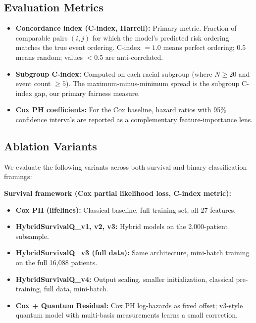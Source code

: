 \documentclass[12pt, letterpaper]{article}
\begin{document}
\subsection{Evaluation Metrics}
\begin{itemize}
    \item \textbf{Concordance index (C-index, Harrell):} Primary metric. Fraction of comparable pairs $(i, j)$ for which the model's predicted risk ordering matches the true event ordering. C-index $= 1.0$ means perfect ordering; $0.5$ means random; values $< 0.5$ are anti-correlated.
    \item \textbf{Subgroup C-index:} Computed on each racial subgroup (where $N \geq 20$ and event count $\geq 5$). The maximum-minus-minimum spread is the subgroup C-index gap, our primary fairness measure.
    \item \textbf{Cox PH coefficients:} For the Cox baseline, hazard ratios with 95\% confidence intervals are reported as a complementary feature-importance lens.
\end{itemize}

\subsection{Ablation Variants}
We evaluate the following variants across both survival and binary classification framings:

\noindent\textbf{Survival framework (Cox partial likelihood loss, C-index metric):}
\begin{itemize}
    \item \textbf{Cox PH (lifelines):} Classical baseline, full training set, all 27 features.
    \item \textbf{HybridSurvivalQ\_v1, v2, v3:} Hybrid models on the 2{,}000-patient subsample.
    \item \textbf{HybridSurvivalQ\_v3 (full data):} Same architecture, mini-batch training on the full 16{,}088 patients.
    \item \textbf{HybridSurvivalQ\_v4:} Output scaling, smaller initialization, classical pre-training, full data, mini-batch.
    \item \textbf{Cox + Quantum Residual:} Cox PH log-hazards as fixed offset; v3-style quantum model with multi-basis measurements learns a small correction.
\end{itemize}
\end{document}
